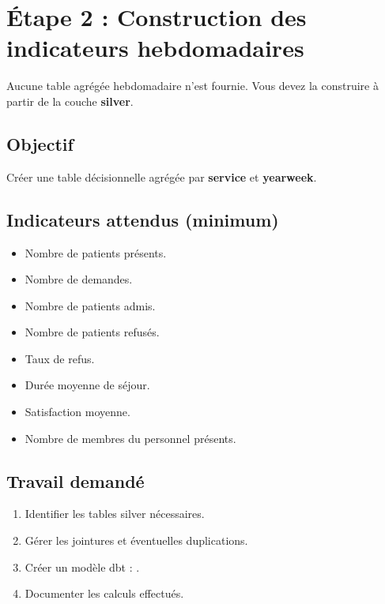 \documentclass[11pt,a4paper]{article}
\begin{document}

\section{Étape 2 : Construction des indicateurs hebdomadaires}

Aucune table agrégée hebdomadaire n’est fournie.
Vous devez la construire à partir de la couche \textbf{silver}.

\subsection*{Objectif}

Créer une table décisionnelle agrégée par \textbf{service} et \textbf{yearweek}.

\subsection*{Indicateurs attendus (minimum)}

\begin{itemize}
  \item Nombre de patients présents.
  \item Nombre de demandes.
  \item Nombre de patients admis.
  \item Nombre de patients refusés.
  \item Taux de refus.
  \item Durée moyenne de séjour.
  \item Satisfaction moyenne.
  \item Nombre de membres du personnel présents.
\end{itemize}

\subsection*{Travail demandé}

\begin{enumerate}
  \item Identifier les tables silver nécessaires.
  \item Gérer les jointures et éventuelles duplications.
  \item Créer un modèle dbt : .
  \item Documenter les calculs effectués.
\end{enumerate}
\end{document}
